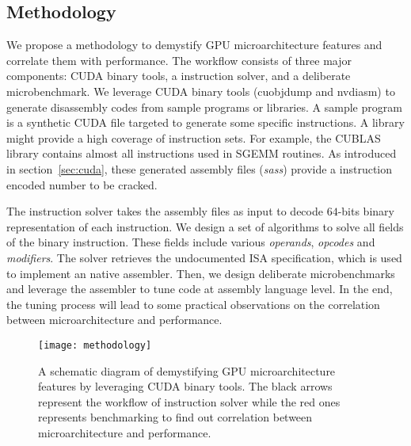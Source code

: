 \subsection{Methodology}

We propose a methodology to demystify GPU microarchitecture features and correlate them with performance. 
The workflow consists of three major components: CUDA binary tools, a instruction solver, and a deliberate microbenchmark. 
We leverage CUDA binary tools (cuobjdump and nvdiasm) to generate disassembly codes from sample programs or libraries. 
A sample program is a synthetic CUDA file targeted to generate some specific instructions. A library might provide a high coverage of instruction sets. For example, the CUBLAS library contains almost all instructions used in SGEMM routines. As introduced in section~\ref{sec:cuda}, these generated assembly files ({\em sass}) provide a instruction encoded number to be cracked.

The instruction solver takes the assembly files as input to decode $64$-bits binary representation of each instruction. We design a set of algorithms to solve all fields of the binary instruction. These fields include various {\em operands}, {\em opcodes} and {\em modifiers}. The solver retrieves the undocumented ISA specification, which is used to implement an native assembler. Then, we design deliberate microbenchmarks and leverage the assembler to tune code at assembly language level. In the end, the tuning process will lead to some practical observations on the correlation between microarchitecture and performance.

\begin{figure}[htbp]
\begin{center}
\texttt{[image: methodology]}
\caption{A schematic diagram of demystifying GPU microarchitecture features by leveraging CUDA binary tools. The black arrows represent the workflow of instruction solver while the red ones represents benchmarking to find out correlation between microarchitecture and performance.}
\label{fig:workflow}
\end{center}
\end{figure}


